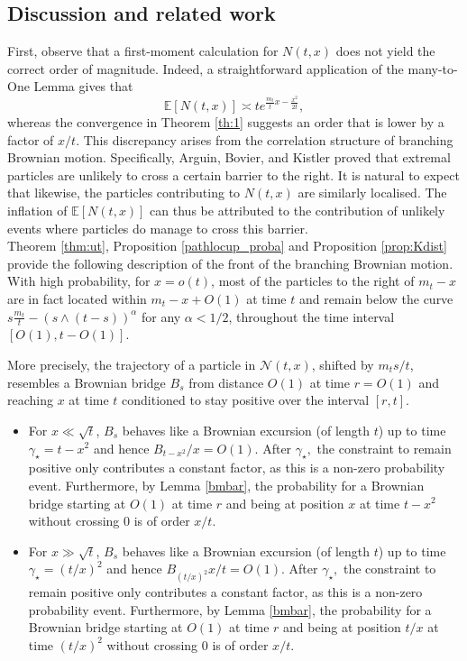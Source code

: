 \documentclass{article}
\newcommand{\E}[0]{\mathbb{E}}
\begin{document}
\subsection{Discussion and related work}

First, observe that a first-moment calculation for $N(t,x)$ does not yield the correct order of magnitude. Indeed, a straightforward application of the many-to-One Lemma gives that
\begin{equation}
    \E[N(t,x)] \asymp t e^{\frac{m_t}{t}x - \frac{x^2}{2t}},
\end{equation}
whereas the convergence in Theorem \ref{th:1} suggests an order that is lower by a factor of $x/t$. This discrepancy arises from the correlation structure of branching Brownian motion. Specifically,  Arguin, Bovier, and Kistler \cite{Arguin2016} proved that extremal particles are unlikely to cross a certain barrier to the right. It is natural to expect that likewise, the particles contributing to $N(t,x)$ are similarly localised. The inflation of $\E[N(t,x)]$ can thus be attributed to the contribution of unlikely events where particles do manage to cross this barrier.\\

Theorem \ref{thm:ut}, Proposition \ref{pathlocup_proba} and Proposition \ref{prop:Kdist} provide the following description of the front of the branching Brownian motion. With high probability, for $x = o(t)$, most of the particles to the right of $m_t - x$ are in fact located within $m_t - x + O(1)$ at time $t$ and remain below the curve  $s\frac{m_t}{t}- (s\wedge(t-s))^\alpha$ for any $\alpha < 1/2$, throughout the time interval $[O(1), t - O(1)]$.  

More precisely, the trajectory of a particle in $\mathcal{N}(t,x)$, shifted by $m_ts/t$, resembles a Brownian bridge $B_s$ from distance $O(1)$ at time $r=O(1)$ and reaching $x$ at time $t$ conditioned to stay positive over the interval $[r, t]$.
\begin{itemize}
    \item For $x\ll \sqrt{t}$, $B_s$ behaves like a Brownian excursion (of length $t$) up to time $\gamma_\star =t-x^2$ and hence $B_{t-x^2}/x=O(1)$. After $\gamma_\star,$ the constraint to remain positive only contributes a constant factor, as this is a non-zero probability event. Furthermore, by Lemma \ref{bmbar}, the probability for a Brownian bridge starting at $O(1)$ at time $r$ and being at position $x$ at time $t-x^2$ without crossing 0 is of order $x/t$. 
    \item For $x\gg \sqrt{t}$, $B_s$ behaves like a Brownian excursion (of length $t$) up to time $\gamma_\star=(t/x)^2$ and hence $B_{(t/x)^2}x/t=O(1)$. After $\gamma_\star,$ the constraint to remain positive only contributes a constant factor, as this is a non-zero probability event. Furthermore, by Lemma \ref{bmbar}, the probability for a Brownian bridge starting at $O(1)$ at time $r$ and being at position $t/x$ at time $(t/x)^2$ without crossing 0 is of order $x/t$.
\end{itemize}
\end{document}
